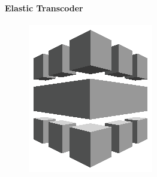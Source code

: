 \documentclass[
12pt,
english,
ngerman,
headsepline,
twoside,
openright,
numbers=noenddot,version=first
]{scrreprt}
\begin{document}
\paragraph{Elastic Transcoder}
\begin{figure}
	\includegraphics[width=0.9\linewidth]{./pics/aws/ApplicationServices_GRAYSCALE_AmazonElasticTranscoder.eps}
\end{figure}
\end{document}
